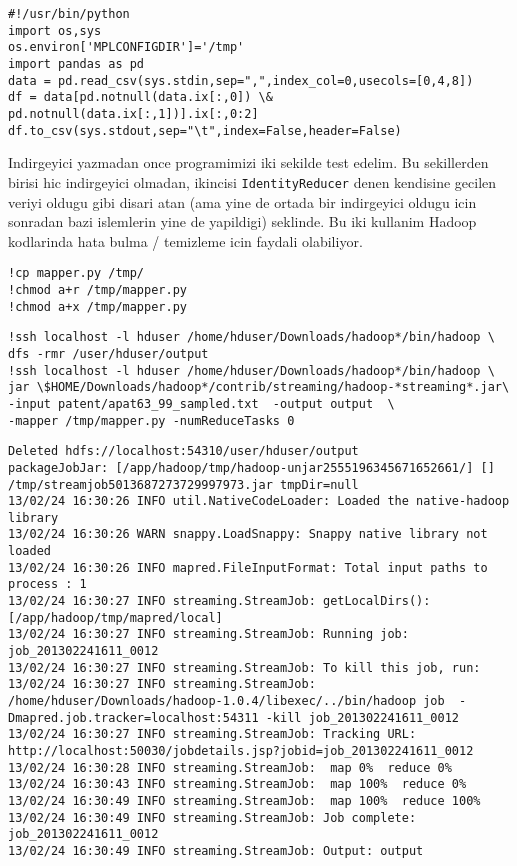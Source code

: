 \documentclass[12pt,fleqn]{article}\usepackage{../common}
\begin{document}
\begin{verbatim}
#!/usr/bin/python
import os,sys
os.environ['MPLCONFIGDIR']='/tmp' 
import pandas as pd
data = pd.read_csv(sys.stdin,sep=",",index_col=0,usecols=[0,4,8])
df = data[pd.notnull(data.ix[:,0]) \& pd.notnull(data.ix[:,1])].ix[:,0:2]
df.to_csv(sys.stdout,sep="\t",index=False,header=False)
\end{verbatim}

Indirgeyici yazmadan once programimizi iki sekilde test edelim. Bu
sekillerden birisi hic indirgeyici olmadan, ikincisi
\verb!IdentityReducer! denen kendisine gecilen veriyi oldugu
gibi disari atan (ama yine de ortada bir indirgeyici oldugu icin
sonradan bazi islemlerin yine de yapildigi) seklinde. Bu iki kullanim
Hadoop kodlarinda hata bulma / temizleme icin faydali olabiliyor.

\begin{verbatim}
!cp mapper.py /tmp/
!chmod a+r /tmp/mapper.py
!chmod a+x /tmp/mapper.py
\end{verbatim}

\begin{verbatim}
!ssh localhost -l hduser /home/hduser/Downloads/hadoop*/bin/hadoop \
dfs -rmr /user/hduser/output
!ssh localhost -l hduser /home/hduser/Downloads/hadoop*/bin/hadoop \
jar \$HOME/Downloads/hadoop*/contrib/streaming/hadoop-*streaming*.jar\
-input patent/apat63_99_sampled.txt  -output output  \
-mapper /tmp/mapper.py -numReduceTasks 0 
\end{verbatim}

\begin{verbatim}
Deleted hdfs://localhost:54310/user/hduser/output
packageJobJar: [/app/hadoop/tmp/hadoop-unjar2555196345671652661/] [] /tmp/streamjob5013687273729997973.jar tmpDir=null
13/02/24 16:30:26 INFO util.NativeCodeLoader: Loaded the native-hadoop library
13/02/24 16:30:26 WARN snappy.LoadSnappy: Snappy native library not loaded
13/02/24 16:30:26 INFO mapred.FileInputFormat: Total input paths to process : 1
13/02/24 16:30:27 INFO streaming.StreamJob: getLocalDirs(): [/app/hadoop/tmp/mapred/local]
13/02/24 16:30:27 INFO streaming.StreamJob: Running job: job_201302241611_0012
13/02/24 16:30:27 INFO streaming.StreamJob: To kill this job, run:
13/02/24 16:30:27 INFO streaming.StreamJob: /home/hduser/Downloads/hadoop-1.0.4/libexec/../bin/hadoop job  -Dmapred.job.tracker=localhost:54311 -kill job_201302241611_0012
13/02/24 16:30:27 INFO streaming.StreamJob: Tracking URL: http://localhost:50030/jobdetails.jsp?jobid=job_201302241611_0012
13/02/24 16:30:28 INFO streaming.StreamJob:  map 0%  reduce 0%
13/02/24 16:30:43 INFO streaming.StreamJob:  map 100%  reduce 0%
13/02/24 16:30:49 INFO streaming.StreamJob:  map 100%  reduce 100%
13/02/24 16:30:49 INFO streaming.StreamJob: Job complete: job_201302241611_0012
13/02/24 16:30:49 INFO streaming.StreamJob: Output: output
\end{verbatim}
\end{document}
